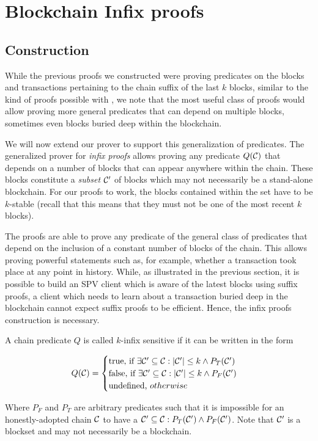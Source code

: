 \section{Blockchain Infix proofs}

\subsection{Construction}

While the previous proofs we constructed were proving predicates on the blocks
and transactions pertaining to the chain suffix of the last $k$ blocks, similar
to the kind of proofs possible with \cite{KLS}, we note that the most useful
class of proofs would allow proving more general predicates that can depend on
multiple blocks, sometimes even blocks buried deep within the blockchain.

We will now extend our prover to support this generalization of predicates. The
generalized prover for \textit{infix proofs} allows proving any predicate
$Q(\mathcal{C})$ that depends on a number of blocks that can appear anywhere within
the chain. These blocks constitute a \textit{subset} $\mathcal{C}'$ of blocks which
may not necessarily be a stand-alone blockchain. For our proofs to work, the
blocks contained within the set have to be $k$-stable (recall that this means
that they must not be one of the most recent $k$ blocks).

The proofs are able to prove any predicate of the general class of predicates
that depend on the inclusion of a constant number of blocks of the chain. This
allows proving powerful statements such as, for example, whether a transaction
took place at any point in history. While, as illustrated in the previous
section, it is possible to build an SPV client which is aware of the latest
blocks using suffix proofs, a client which needs to learn about a transaction
buried deep in the blockchain cannot expect suffix proofs to be efficient.
Hence, the infix proofs construction is necessary.

\begin{definition}
A chain predicate $Q$ is called $k$-\textnormal{infix sensitive} if it can be
written in the form

$$
Q(\mathcal{C}) =
\begin{cases}
  \text{true, if }
    \exists \mathcal{C}' \subseteq \mathcal{C}: |\mathcal{C}'| \leq k \land P_T(\mathcal{C}')\\
  \text{false, if }
    \exists \mathcal{C}' \subseteq \mathcal{C}: |\mathcal{C}'| \leq k \land P_F(\mathcal{C}')\\
  \text{undefined, } otherwise
\end{cases}
$$

Where $P_F$ and $P_T$ are arbitrary predicates such that it is impossible for
an honestly-adopted chain $\mathcal{C}$ to have a
$\mathcal{C}' \subseteq \mathcal{C}: P_T(\mathcal{C}') \land P_F(\mathcal{C}')$. Note that $\mathcal{C}'$
is a blockset and may not necessarily be a blockchain.
\end{definition}

